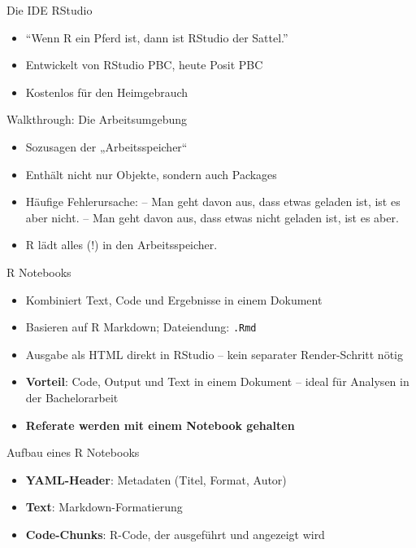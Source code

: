 \documentclass[
  ignorenonframetext,
]{beamer}
\providecommand{\tightlist}{%
  \setlength{\itemsep}{0pt}\setlength{\parskip}{0pt}}
\begin{document}
\begin{frame}{Die IDE RStudio}
\protect{}\label{die-ide-rstudio}
\begin{itemize}
\tightlist
\item
  ``Wenn R ein Pferd ist, dann ist RStudio der Sattel.''
\item
  Entwickelt von RStudio PBC, heute Posit PBC
\item
  Kostenlos für den Heimgebrauch
\end{itemize}
\end{frame}

\begin{frame}{Walkthrough: Die Arbeitsumgebung}
\protect{}\label{walkthrough-die-arbeitsumgebung}
\begin{itemize}
\tightlist
\item
  Sozusagen der „Arbeitsspeicher``
\item
  Enthält nicht nur Objekte, sondern auch Packages
\item
  Häufige Fehlerursache: -- Man geht davon aus, dass etwas geladen ist,
  ist es aber nicht. -- Man geht davon aus, dass etwas nicht geladen
  ist, ist es aber.
\item
  R lädt alles (!) in den Arbeitsspeicher.
\end{itemize}
\end{frame}

\begin{frame}[fragile]{R Notebooks}
\protect{}\label{r-notebooks}
\begin{itemize}
\tightlist
\item
  Kombiniert Text, Code und Ergebnisse in einem Dokument
\item
  Basieren auf R Markdown; Dateiendung: \texttt{.Rmd}
\item
  Ausgabe als HTML direkt in RStudio -- kein separater Render-Schritt
  nötig
\item
  \textbf{Vorteil}: Code, Output und Text in einem Dokument -- ideal für
  Analysen in der Bachelorarbeit
\item
  \textbf{Referate werden mit einem Notebook gehalten}
\end{itemize}
\end{frame}

\begin{frame}{Aufbau eines R Notebooks}
\protect{}\label{aufbau-eines-r-notebooks}
\begin{itemize}
\tightlist
\item
  \textbf{YAML-Header}: Metadaten (Titel, Format, Autor)
\item
  \textbf{Text}: Markdown-Formatierung
\item
  \textbf{Code-Chunks}: R-Code, der ausgeführt und angezeigt wird
\end{itemize}
\end{frame}
\end{document}
